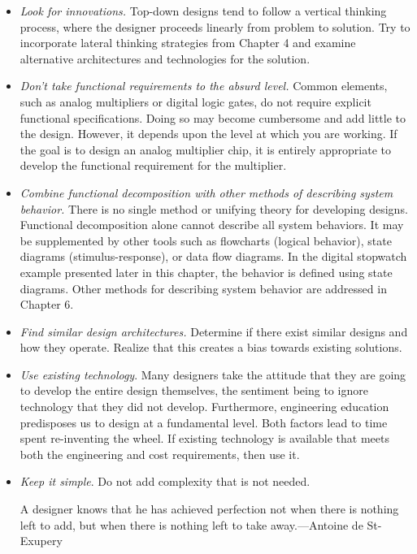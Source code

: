 \begin{itemize}
\item
  \emph{Look for innovations.} Top-down designs tend to follow a
  vertical thinking process, where the designer proceeds linearly from
  problem to solution. Try to incorporate lateral thinking strategies
  from Chapter 4 and examine alternative architectures and technologies
  for the solution.
\item
  \emph{Don't take functional requirements to the absurd level.} Common
  elements, such as analog multipliers or digital logic gates, do not
  require explicit functional specifications. Doing so may become
  cumbersome and add little to the design. However, it depends upon the
  level at which you are working. If the goal is to design an analog
  multiplier chip, it is entirely appropriate to develop the functional
  requirement for the multiplier.
\item
  \emph{Combine functional decomposition with other methods of
  describing system behavior.} There is no single method or unifying
  theory for developing designs. Functional decomposition alone cannot
  describe all system behaviors. It may be supplemented by other tools
  such as flowcharts (logical behavior), state diagrams
  (stimulus-response), or data flow diagrams. In the digital stopwatch
  example presented later in this chapter, the behavior is defined using
  state diagrams. Other methods for describing system behavior are
  addressed in Chapter 6.
\item
  \emph{Find similar design architectures.} Determine if there exist
  similar designs and how they operate. Realize that this creates a bias
  towards existing solutions.
\item
  \emph{Use existing technology}. Many designers take the attitude that
  they are going to develop the entire design themselves, the sentiment
  being to ignore technology that they did not develop. Furthermore,
  engineering education predisposes us to design at a fundamental level.
  Both factors lead to time spent re-inventing the wheel. If existing
  technology is available that meets both the engineering and cost
  requirements, then use it.
\item
  \emph{Keep it simple}. Do not add complexity that is not needed.


\begin{itquote}
A designer knows that he has achieved perfection not when there is
nothing left to add, but when there is nothing left to take
away.---Antoine de St-Exupery
\end{itquote}



\end{itemize}
